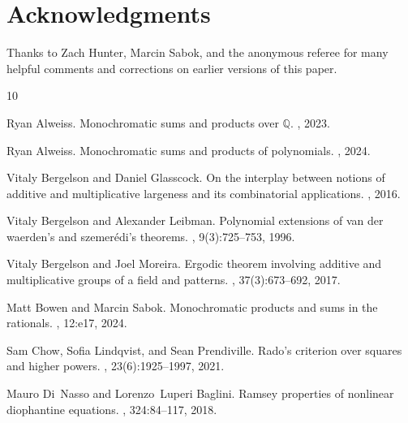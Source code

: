 \documentclass[tocmacros]{daj}
\begin{document}
\section*{Acknowledgments} %
Thanks to Zach Hunter, Marcin Sabok, and the anonymous referee for many helpful comments and corrections on earlier versions of this paper.



\begin{thebibliography}{10}

Ryan Alweiss.
\newblock Monochromatic sums and products over $\mathbb{Q}$.
, 2023.

Ryan Alweiss.
\newblock Monochromatic sums and products of polynomials.
, 2024.

Vitaly Bergelson and Daniel Glasscock.
\newblock On the interplay between notions of additive and multiplicative
  largeness and its combinatorial applications.
, 2016.

Vitaly Bergelson and Alexander Leibman.
\newblock Polynomial extensions of van der waerden’s and szemer{\'e}di’s
  theorems.
, 9(3):725--753,
  1996.

Vitaly Bergelson and Joel Moreira.
\newblock Ergodic theorem involving additive and multiplicative groups of a
  field and patterns.
, 37(3):673--692, 2017.

Matt Bowen and Marcin Sabok.
\newblock Monochromatic products and sums in the rationals.
, 12:e17, 2024.

Sam Chow, Sofia Lindqvist, and Sean Prendiville.
\newblock Rado's criterion over squares and higher powers.
, 23(6):1925--1997,
  2021.

Mauro Di~Nasso and Lorenzo~Luperi Baglini.
\newblock Ramsey properties of nonlinear diophantine equations.
, 324:84--117, 2018.


\end{thebibliography}
\end{document}
